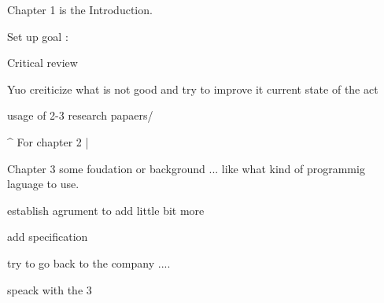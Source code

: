 
Chapter 1 is the Introduction.


Set up goal :

Critical review

Yuo creiticize what is not good and try to improve it
current state of the act

	usage of 2-3 research papaers/

              ^
For chapter 2 |


Chapter 3 
some foudation or background ... like what kind of programmig laguage to use.

establish agrument to add little bit more

add specification

try  to go back to the company ....
 
  speack with the 3 